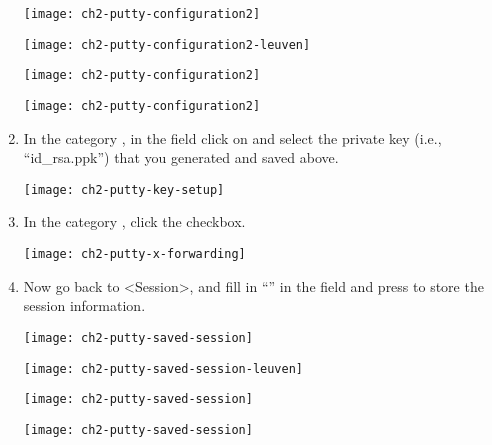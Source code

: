 \begin{enumerate}
\ifantwerpen
      \begin{center}
      \texttt{[image: ch2-putty-configuration2]}
      \end{center}
\fi
\ifleuven
      \begin{center}
      \texttt{[image: ch2-putty-configuration2-leuven]}
      \end{center}
\fi
\ifbrussel
      \begin{center}
      \texttt{[image: ch2-putty-configuration2]}
      \end{center}
\fi
\ifgent
      \begin{center}
      \texttt{[image: ch2-putty-configuration2]}
      \end{center}
\fi

    \item  In the category , in the
      field  click on
       and select the private key (i.e., ``id\_rsa.ppk'')
      that you generated and saved above.

      \begin{center}
      \texttt{[image: ch2-putty-key-setup]}
      \end{center}

    \item  In the category , click
      the  checkbox.

      \begin{center}
      \texttt{[image: ch2-putty-x-forwarding]}
      \end{center}

    \item  Now go back to <{}Session>{}, and fill in ``\emph{\hpcname}'' in the
       field and press  to
      store the session information.

\ifantwerpen
      \begin{center}
      \texttt{[image: ch2-putty-saved-session]}
      \end{center}
\fi
\ifleuven
      \begin{center}
      \texttt{[image: ch2-putty-saved-session-leuven]}
      \end{center}
\fi
\ifbrussel
      \begin{center}
      \texttt{[image: ch2-putty-saved-session]}
      \end{center}
\fi
\ifgent
      \begin{center}
      \texttt{[image: ch2-putty-saved-session]}
      \end{center}
\fi



\end{enumerate}
